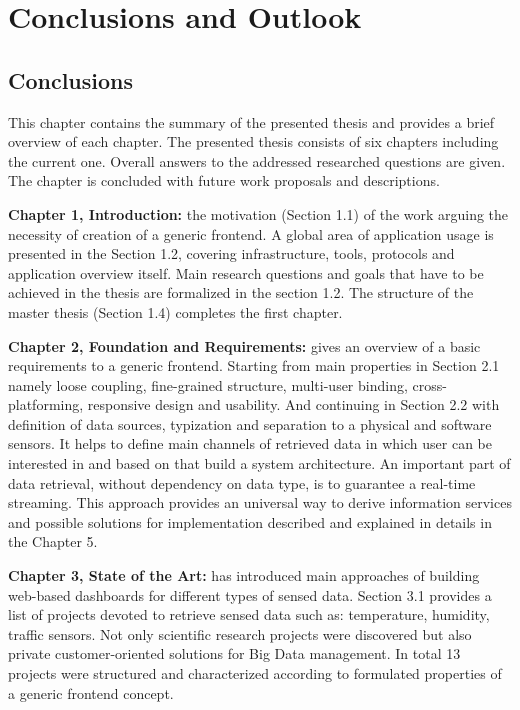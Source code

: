 \chapter{Conclusions and Outlook}

\section{Conclusions}
This chapter contains the summary of the presented thesis and provides a brief overview of each chapter. The presented thesis consists of six chapters including the current one. Overall answers to the addressed researched questions are given. The chapter is concluded with future work proposals and descriptions.

\textbf{Chapter 1, Introduction:} the motivation (Section 1.1) of the work arguing the necessity of creation of a generic frontend. A global area of application usage is presented in the Section 1.2, covering infrastructure, tools, protocols and application overview itself. Main research questions and goals that have to be achieved in the thesis are formalized in the section 1.2. The structure of the master thesis (Section 1.4) completes the first chapter. 
   
\textbf{Chapter 2, Foundation and Requirements:} gives an overview of a basic requirements to a generic frontend. Starting from main properties in Section 2.1 namely loose coupling, fine-grained structure, multi-user binding, cross-platforming, responsive design and usability. And continuing in Section 2.2 with definition of data sources, typization and separation to a physical and software sensors. It helps to define main channels of retrieved data in which user can be interested in and based on that build a system architecture. An important part of data retrieval, without dependency on data type, is to guarantee a real-time streaming. This approach provides an universal way to derive information services and possible solutions for implementation described and explained in details in the Chapter 5.
    
\textbf{Chapter 3, State of the Art:} has introduced main approaches of building web-based dashboards for different types of sensed data. Section 3.1 provides a list of projects devoted to retrieve sensed data such as: temperature, humidity, traffic sensors. Not only scientific research projects were discovered but also private customer-oriented solutions for Big Data management. In total 13 projects were structured and characterized according to formulated properties of a generic frontend concept.

